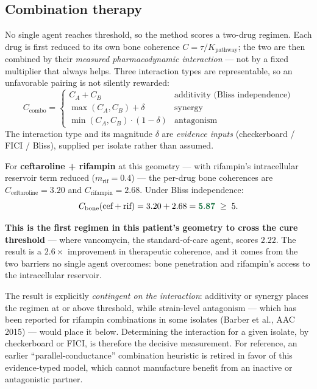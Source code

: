 \documentclass[11pt]{article}
\begin{document}
\subsection*{Combination therapy}

No single agent reaches threshold, so the method scores a two-drug regimen. Each
drug is first reduced to its own bone coherence $C = \tau / K_{\text{pathway}}$;
the two are then combined by their \emph{measured pharmacodynamic interaction} —
not by a fixed multiplier that always helps. Three interaction types are
representable, so an unfavorable pairing is not silently rewarded:
\[
  C_{\text{combo}} =
  \begin{cases}
    C_A + C_B & \text{additivity (Bliss independence)} \\
    \max(C_A, C_B) + \delta & \text{synergy} \\
    \min(C_A, C_B) \cdot (1 - \delta) & \text{antagonism}
  \end{cases}
\]
The interaction type and its magnitude $\delta$ are \emph{evidence inputs}
(checkerboard / FICI / Bliss), supplied per isolate rather than assumed.

For \textbf{ceftaroline + rifampin} at this geometry — with rifampin's
intracellular reservoir term reduced ($m_{\text{rif}} = 0.4$) — the per-drug bone
coherences are $C_{\text{ceftaroline}} = 3.20$ and $C_{\text{rifampin}} = 2.68$.
Under Bliss independence:
\[
  C_{\text{bone}}(\text{cef} + \text{rif}) = 3.20 + 2.68 =
  {\color{dkgreen}\mathbf{5.87}} \;\geq\; 5.
\]

\textbf{This is the first regimen in this patient's geometry to cross the cure
threshold} — where vancomycin, the standard-of-care agent, scores $2.22$. The
result is a $2.6\times$ improvement in therapeutic coherence, and it comes from
the two barriers no single agent overcomes: bone penetration and rifampin's
access to the intracellular reservoir.

The result is explicitly \emph{contingent on the interaction}: additivity or
synergy places the regimen at or above threshold, while strain-level antagonism
— which has been reported for rifampin combinations in some isolates (Barber et
al., AAC 2015) — would place it below. Determining the interaction for a given
isolate, by checkerboard or FICI, is therefore the decisive measurement. For
reference, an earlier ``parallel-conductance'' combination heuristic is retired
in favor of this evidence-typed model, which cannot manufacture benefit from an
inactive or antagonistic partner.
\end{document}
